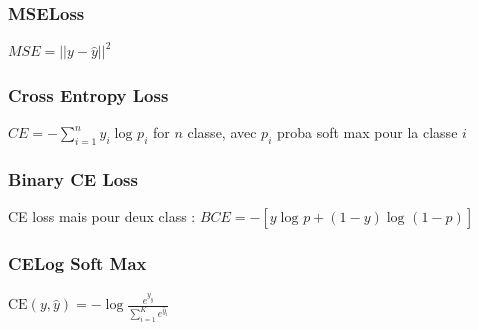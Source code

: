 \documentclass{article}
\begin{document}
\begin{multicols}{2}
\begin{multicols}{2}
\subsubsection{MSELoss}
$ MSE = ||y - \hat{y}||^2 $ 

\subsubsection{Cross Entropy Loss}
$ CE = - \sum_{i=1}^{n} y_i \log_{} p_i $ for $ n $ classe, avec $ p_i $ proba soft max pour la classe $ i $ 

\subsubsection{Binary CE Loss}
CE loss mais pour deux class : $ BCE = - [ y \log_{} p + (1 - y) \log_{} (1 - p) ] $ 

\subsubsection{CELog Soft Max}
$ \displaystyle \text{CE}(y, \hat{y}) = - \log \frac {e^{\hat{y}_y}} {\sum_{i=1}^{K}e^{\hat{y}_i}} $

\end{multicols}


\end{multicols}
\end{document}
